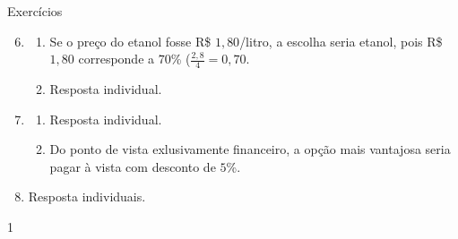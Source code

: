 \begin{answer}{Exercícios}
{\exerciselist
\begin{enumerate}\setcounter{enumi}{5}
  \item
  \begin{enumerate}
    \item Se o preço do etanol fosse R\$ $1{,}80$/litro, a escolha seria etanol, pois R\$ $1{,}80$ corresponde a $70$\% ($\displaystyle\frac{2{,}8}{4}=0{,}70$.
    \item Resposta individual.
  \end{enumerate}
  \item 
  \begin{enumerate}
    \item Resposta individual.
    \item Do ponto de vista exlusivamente financeiro, a opção mais vantajosa seria pagar à vista com desconto de $5$\%.
  \end{enumerate}
  \setcounter{enumi}{8}
  \item Resposta individuais.

\end{enumerate}
}{1}
\end{answer}
